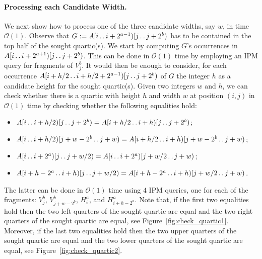 \documentclass[11pt,letterpaper]{article}
\newcommand{\cO}{\mathcal{O}}
\def\dd{\mathinner{.\,.}}
\newcommand{\hmeta}[2]{H_{#1}^{#2}}
\newcommand{\vmeta}[2]{V_{#1}^{#2}}
\begin{document}
\paragraph{Processing each Candidate Width.}
We next show how to process one of the three candidate widths, say $w$, in time $\cO(1)$.
Observe that $G:=A[i \dd i + 2^{a-1})[j \dd j + 2^{b})$ has to be contained in the top half of the sought quartic(s).
We start by computing $G$'s occurrences in $A[i \dd i + 2^{a+1})[j \dd j + 2^{b})$.
This can be done in $\cO(1)$ time by employing an IPM query for fragments of $\vmeta{j}{b}$.
It would then be enough to consider, for each occurrence $A[i+h/2 \dd i + h/2 + 2^{a-1})[j \dd j + 2^{b})$ of $G$ the integer $h$ as a candidate height for the sought quartic(s).
Given two integers $w$ and $h$, we can check whether there is a quartic with height $h$ and width $w$ at position $(i,j)$ in $\cO(1)$ time by checking whether the following equalities hold:
    \begin{itemize}
        \item $A[i \dd i + h/2)[j \dd j + 2^{b})=A[i+h/2 \dd i + h)[j \dd j + 2^{b})$;
        \item $A[i \dd i + h/2)[j+w-2^b \dd j + w)=A[i+h/2 \dd i + h)[j+w-2^b \dd j + w)$;
        \item $A[i \dd i + 2^a)[j \dd j + w/2)=A[i \dd i + 2^a)[j+w/2 \dd j + w)$;
        \item $A[i+h-2^a \dd i + h)[j \dd j + w/2)=A[i+h-2^a \dd i + h)[j+w/2 \dd j + w)$.
    \end{itemize}
The latter can be done in $\cO(1)$ time using $4$ IPM queries, one for each of the fragments: $\vmeta{j}{b}$, $\vmeta{j+w-2^b}{b}$, $\hmeta{i}{a}$, and $\hmeta{i+h-2^a}{a}$. Note that, if the first two equalities hold then the two left quarters of the sought quartic are equal and the two right quarters of the sought quartic are equal, see Figure~\ref{fig:check_quartic1}. Moreover, if the last two equalities hold then the two upper quarters of the sought quartic are equal and the two lower quarters of the sought quartic are equal, see Figure~\ref{fig:check_quartic2}.
\end{document}
